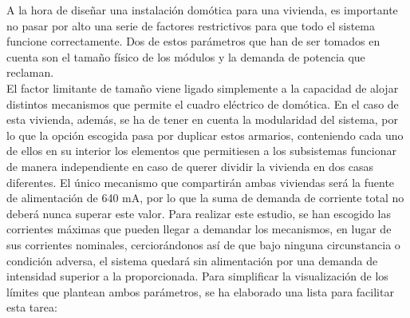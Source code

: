 A la hora de diseñar una instalación domótica para una vivienda, es importante no pasar por alto una serie de factores restrictivos para que todo el sistema funcione correctamente. Dos de estos parámetros que han de ser tomados en cuenta son el tamaño físico de los módulos y la demanda de potencia que reclaman.\\
 El factor limitante de tamaño viene ligado simplemente a la capacidad de alojar distintos mecanismos que permite el cuadro eléctrico de domótica. En el caso de esta vivienda, además, se ha de tener en cuenta la modularidad del sistema, por lo que la opción escogida pasa por duplicar estos armarios, conteniendo cada uno de ellos en su interior los elementos que permitiesen a los subsistemas funcionar de manera independiente en caso de querer dividir la vivienda en dos casas diferentes. El único mecanismo que compartirán ambas viviendas será la fuente de alimentación de 640 mA, por lo que la suma de demanda de corriente total no deberá nunca superar este valor. Para realizar este estudio, se han escogido las corrientes máximas que pueden llegar a demandar los mecanismos, en lugar de sus corrientes nominales, cerciorándonos así de que bajo ninguna circunstancia o condición adversa, el sistema quedará sin alimentación por una demanda de intensidad superior a la proporcionada. Para simplificar la visualización de los límites que plantean ambos parámetros, se ha elaborado una lista para facilitar esta tarea:

